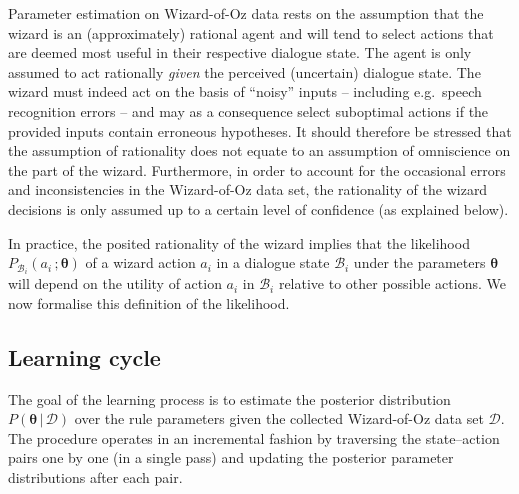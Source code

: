 Parameter estimation on Wizard-of-Oz data rests on the assumption that the wizard is an (approximately) rational agent and will tend to select actions that are deemed most useful in their respective dialogue state. The agent is only assumed to act rationally \textit{given} the perceived (uncertain) dialogue state. The wizard must indeed act on the basis of ``noisy'' inputs -- including e.g.\ speech recognition errors -- and may as a consequence select suboptimal actions if the provided inputs contain erroneous hypotheses. It should therefore be stressed that the assumption of rationality does not equate to an assumption of omniscience on the part of the wizard.  Furthermore, in order to account for the occasional errors and inconsistencies in the Wizard-of-Oz data set, the rationality of the wizard decisions is only assumed up to a certain level of confidence (as explained below). 

In practice, the posited rationality of the wizard implies that the likelihood $P_{\mathcal{B}_i}(a_i\,; \boldsymbol\theta)$ of a wizard action $a_i$ in a dialogue state $\mathcal{B}_i$ under the parameters $\boldsymbol\theta$ will depend on the utility of action $a_i$ in $\mathcal{B}_i$ relative to other possible actions.  We now formalise this definition of the likelihood.

\subsection{Learning cycle}
\label{sec:rule-supervised-learning}

The goal of the learning process is to estimate the posterior distribution $P(\boldsymbol\theta \, | \, \mathcal{D})$ over the rule parameters given the collected Wizard-of-Oz data set $\mathcal{D}$. The procedure operates in an incremental fashion by traversing the state--action pairs one by one (in a single pass) and updating the posterior parameter distributions after each pair.  

